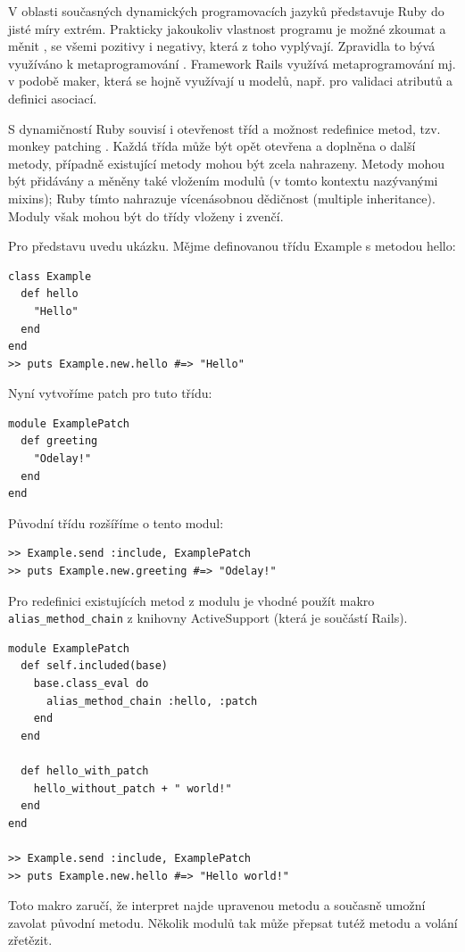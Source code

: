 \documentclass[thesis=B,czech]{FITthesis}[2012/05/02]
\begin{document}
V oblasti současných dynamických programovacích jazyků představuje Ruby do jisté
míry extrém. Prakticky jakoukoliv vlastnost programu je možné zkoumat
a měnit , se všemi pozitivy i negativy, která z toho vyplývají.
Zpravidla to bývá využíváno k metaprogramování \citep[3c]{why2008}.
Framework Rails využívá metaprogramování mj. v podobě maker, která se
hojně využívají u modelů, např. pro validaci atributů a definici
asociací.

S dynamičností Ruby souvisí i otevřenost tříd a možnost redefinice
metod, tzv. monkey patching \citep[str. 293]{Olsen2011}. Každá třída
může být opět otevřena a doplněna o další metody, případně existující
metody mohou být zcela nahrazeny. Metody mohou být přidávány a měněny
také vložením modulů (v tomto kontextu nazývanými mixins); Ruby tímto
nahrazuje vícenásobnou dědičnost (multiple inheritance). Moduly však
mohou být do třídy vloženy i zvenčí.

Pro představu uvedu ukázku. Mějme definovanou třídu Example
s metodou hello:

\begin{lstlisting}
class Example
  def hello
    "Hello"
  end
end
>> puts Example.new.hello #=> "Hello"
\end{lstlisting}
Nyní vytvoříme patch pro tuto třídu:

\begin{lstlisting}
module ExamplePatch
  def greeting
    "Odelay!"
  end
end
\end{lstlisting}
Původní třídu rozšíříme o tento modul:

\begin{lstlisting}
>> Example.send :include, ExamplePatch
>> puts Example.new.greeting #=> "Odelay!"
\end{lstlisting}
Pro redefinici existujících metod z modulu je vhodné použít makro \\
\lstinline!alias_method_chain! z knihovny
ActiveSupport (která je součástí Rails).

\begin{lstlisting}
module ExamplePatch
  def self.included(base)
    base.class_eval do
      alias_method_chain :hello, :patch
    end
  end

  def hello_with_patch
    hello_without_patch + " world!"
  end
end

>> Example.send :include, ExamplePatch
>> puts Example.new.hello #=> "Hello world!"
\end{lstlisting}
Toto makro zaručí, že interpret najde upravenou metodu a současně umožní
zavolat původní metodu. Několik modulů tak může přepsat tutéž metodu a
volání zřetězit.
\end{document}
